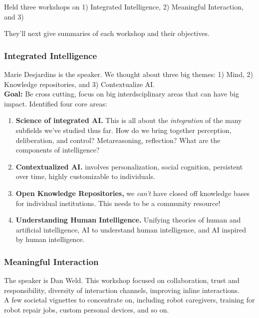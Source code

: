 Held three workshops on 1) Integrated Intelligence, 2) Meaningful Interaction, and 3)

They'll next give summaries of each workshop and their objectives.

\subsubsection{Integrated Intelligence}

Marie Desjardins is the speaker. We thought about three big themes: 1) Mind, 2) Knowledge repositories, and 3) Contextualize AI. \\

{\bf Goal:} Be cross cutting, focus on big interdsciplinary areas that can have big impact. Identified four core areas:
\begin{enumerate}
    \item {\bf Science of integrated AI.} This is all about the {\it integration} of the many subfields we've studied thus far. How do we bring together perception, deliberation, and control? Metareasoning, reflection? What are the components of intelligence?
    \item {\bf Contextualized AI.} involves personalization, social cognition, persistent over time, highly customizable to individuals.
    \item {\bf Open Knowledge Repositories,} we {\it can't} have closed off knowledge bases for individual institutions. This needs to be a community resource! 
    \item {\bf Understanding Human Intelligence.} Unifying theories of human and artificial intelligence, AI to understand human intelligence, and AI inspired by human intelligence.
\end{enumerate}

\subsubsection{Meaningful Interaction}

The speaker is Dan Weld. This workshop focused on collaboration, trust and responsibility, diversity of interaction channels, improving inline interactions. \\

A few societal vignettes to concentrate on, including robot caregivers, training for robot repair jobs, custom personal devices, and so on.

